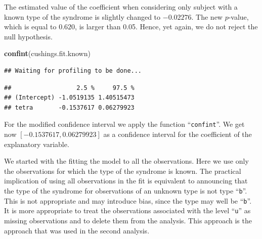 \documentclass[
]{krantz}
\makeatletter
\newenvironment{Shaded}{\begin{snugshade}}{\end{snugshade}}
\newcommand{\KeywordTok}[1]{\textcolor[rgb]{0.13,0.29,0.53}{\textbf{#1}}}
\newcommand{\NormalTok}[1]{#1}
\newenvironment{kframe}{%
\medskip{}
\setlength{\fboxsep}{.8em}
 \def\at@end@of@kframe{}%
 \ifinner\ifhmode%
  \def\at@end@of@kframe{\end{minipage}}%
  \begin{minipage}{\columnwidth}%
 \fi\fi%
 \def\FrameCommand##1{\hskip\@totalleftmargin \hskip-\fboxsep
 \colorbox{shadecolor}{##1}\hskip-\fboxsep
     \hskip-\linewidth \hskip-\@totalleftmargin \hskip\columnwidth}%
 \MakeFramed {\advance\hsize-\width
   \@totalleftmargin\z@ \linewidth\hsize
   \@setminipage}}%
 {\par\unskip\endMakeFramed%
 \at@end@of@kframe}
\renewenvironment{Shaded}{\begin{kframe}}{\end{kframe}}
\theoremstyle{definition}
\theoremstyle{definition}
\theoremstyle{definition}
\theoremstyle{remark}
\makeatother
\begin{document}
\begin{enumerate}
  The estimated value of the coefficient when considering only subject
  with a known type of the syndrome is slightly changed to \(-0.02276\). The
  new \(p\)-value, which is equal to \(0.620\), is larger than 0.05. Hence,
  yet again, we do not reject the null hypothesis.

\begin{Shaded}
\begin{Highlighting}[]
\KeywordTok{confint}\NormalTok{(cushings.fit.known)}
\end{Highlighting}
\end{Shaded}

\begin{verbatim}
## Waiting for profiling to be done...
\end{verbatim}

\begin{verbatim}
##                  2.5 %     97.5 %
## (Intercept) -1.0519135 1.40515473
## tetra       -0.1537617 0.06279923
\end{verbatim}

  For the modified confidence interval we apply the function ``\texttt{confint}''.
  We get now \([-0.1537617, 0.06279923]\) as a confidence interval for the
  coefficient of the explanatory variable.

  We started with the fitting the model to all the observations. Here we
  use only the observations for which the type of the syndrome is known.
  The practical implication of using all observations in the fit is
  equivalent to announcing that the type of the syndrome for observations
  of an unknown type is not type ``\texttt{b}''. This is not appropriate and may
  introduce bias, since the type may well be ``\texttt{b}''. It is more appropriate
  to treat the observations associated with the level ``\texttt{u}'' as missing
  observations and to delete them from the analysis. This approach is the
  approach that was used in the second analysis.
\end{enumerate}

  

\backmatter
\printindex
\end{document}
